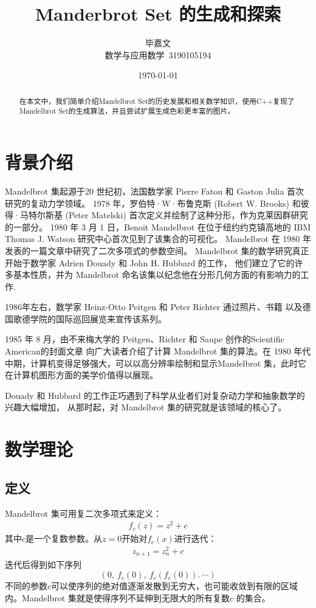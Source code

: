 \documentclass[UTF8]{ctexart}
\title{Manderbrot Set 的生成和探索}
\author{毕嘉文 \\ 数学与应用数学\ 3190105194}
\date{\today}
\begin{document}
\maketitle
\begin{abstract}
在本文中，我们简单介绍Mandelbrot Set的历史发展和相关数学知识，使用C++复现了Mandelbrot Set的生成算法，并且尝试扩展生成色彩更丰富的图片。
\end{abstract}
\section{背景介绍}

Mandelbrot 集起源于20 世纪初，法国数学家 Pierre Fatou 和 Gaston Julia 首次研究的复动力学领域。 
1978 年，罗伯特·W·布鲁克斯 (Robert W. Brooks) 和彼得·马特尔斯基 (Peter Matelski) 首次定义并绘制了这种分形，作为克莱因群研究的一部分。 
\cite{4th1981riemann} 
1980 年 3 月 1 日，Benoit Mandelbrot 在位于纽约约克镇高地的 IBM Thomas J. Watson 研究中心首次见到了该集合的可视化。 \cite{Taylor2008}
Mandelbrot 在 1980 年发表的一篇文章中研究了二次多项式的参数空间。 \cite{https://doi.org/10.1111/j.1749-6632.1980.tb29690.x}
Mandelbrot 集的数学研究真正开始于数学家 Adrien Douady 和 John H. Hubbard \cite{Douady1984tudeDD} 的工作，
他们建立了它的许多基本性质，并为 Mandelbrot 命名该集以纪念他在分形几何方面的有影响力的工作.

1986年左右，数学家 Heinz-Otto Peitgen 和 Peter Richter 通过照片、书籍\cite{peitgen1986beauty} 以及德国歌德学院的国际巡回展览来宣传该系列。

1985 年 8 月，由不来梅大学的 Peitgen、Richter 和 Saupe 创作的Scientific American的封面文章\cite{10.2307/24967754} 向广大读者介绍了计算 Mandelbrot 集的算法。在 1980 年代中期，计算机变得足够强大，可以以高分辨率绘制和显示Mandelbrot 集，此时它在计算机图形方面的美学价值得以展现。

Douady 和 Hubbard 的工作正巧遇到了科学从业者们对复杂动力学和抽象数学的兴趣大幅增加，
从那时起，对 Mandelbrot 集的研究就是该领域的核心了。
\section{数学理论}

\subsection{定义}
Mandelbrot 集可用复二次多项式来定义：\begin{align}
f_c(z) = z^2 + c
\end{align}
其中$c$是一个复数参数。从$z = 0$开始对$f_c(x)$进行迭代：\begin{align}
z_{n+1} = z_n^2 + c
\end{align}
迭代后得到如下序列$$
(0,\ f_c(0),\ f_c(f_c(0)). \ \cdots )
$$
不同的参数$c$可以使序列的绝对值逐渐发散到无穷大，也可能收敛到有限的区域内。Mandelbrot 集就是使得序列不延伸到无限大的所有复数$c$ 的集合。
\end{document}
